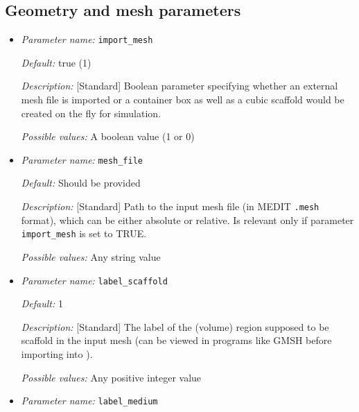 \subsection{Geometry and mesh parameters}
\label{parameters:mesh}

\begin{itemize}

\item {\it Parameter name:} {\tt import\_mesh}
\label{parameters:import_mesh}


{\it Default:} true (1)

{\it Description:} [Standard] Boolean parameter specifying whether an external mesh file is imported or a container box as well as a cubic scaffold would be created on the fly for simulation.

{\it Possible values:} A boolean value (1 or 0)

\item {\it Parameter name:} {\tt mesh\_file}
\label{parameters:mesh_file}


{\it Default:} Should be provided

{\it Description:} [Standard] Path to the input mesh file (in MEDIT {\tt .mesh} format), which can be either absolute or relative. Is relevant only if parameter {\tt import\_mesh} is set to TRUE.

{\it Possible values:} Any string value 


\item {\it Parameter name:} {\tt label\_scaffold}
\label{parameters:label_scaffold}


{\it Default:} 1

{\it Description:} [Standard] The label of the (volume) region supposed to be scaffold in the input mesh (can be viewed in programs like GMSH before importing into \biodeg{}). 

{\it Possible values:} Any positive integer value 


\item {\it Parameter name:} {\tt label\_medium}
\label{parameters:label_medium}


\end{itemize}
